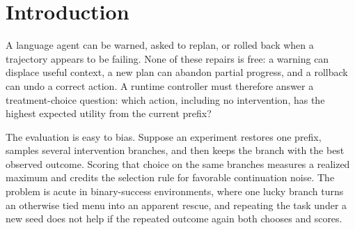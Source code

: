 \begin{abstract}
Selecting a runtime intervention and evaluating it on the same stochastic continuation credits favorable branch noise. We generate two independently seeded continuations for every action from a shared prefix. The same draws separate the action chosen from the outcome that scores it and, before any controller is fitted, read the room a decision point and a menu leave. On 384 identity-disjoint ALFWorld tasks the same-draw maximum overstates cross-draw value by 15.36 percentage points (floorplan-bootstrap 95\% interval [12.46, 18.30]), and does not exceed a within-task exchangeable-label reference of 17.26 points on eligible prefixes. On 593 further tasks run under both rules with one menu, moving the decision from a scheduled early step to the first public failure signal turns a negative reading, 52.50\% for a per-task selector given one independent draw of every action against 53.33\% for the best arm in hindsight, into a positive one, 50.80\% against 49.09\%. A controller that chooses its action on one development draw and values it on another captures 79 percent of the room so created on triggered prefixes and leads every matched comparator, by 1.26 points over continuation on all planned tasks and by 1.94 over the best fixed repair; refitted on development records from the scheduled rule, it leads every comparator on that panel too.

\end{abstract}

\section{Introduction}

A language agent can be warned, asked to replan, or rolled back when a trajectory appears to be failing. None of these repairs is free: a warning can displace useful context, a new plan can abandon partial progress, and a rollback can undo a correct action. A runtime controller must therefore answer a treatment-choice question: which action, including no intervention, has the highest expected utility from the current prefix?

The evaluation is easy to bias. Suppose an experiment restores one prefix, samples several intervention branches, and then keeps the branch with the best observed outcome. Scoring that choice on the same branches measures a realized maximum and credits the selection rule for favorable continuation noise. The problem is acute in binary-success environments, where one lucky branch turns an otherwise tied menu into an apparent rescue, and repeating the task under a new seed does not help if the repeated outcome again both chooses and scores.

